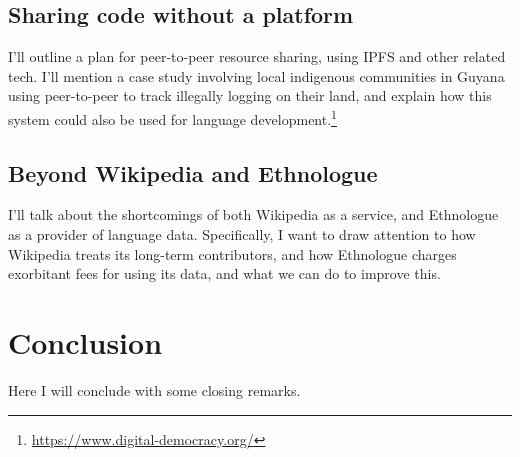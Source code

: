 \subsection{Sharing code without a platform}

I'll outline a plan for peer-to-peer resource sharing, using IPFS \citep{benet2014ipfs} and other related tech. I'll mention a case study involving local indigenous communities in Guyana using peer-to-peer to track illegally logging on their land, and explain how this system could also be used for language development.\footnote{\href{https://www.digital-democracy.org/}{https://www.digital-democracy.org/}}

\subsection{Beyond Wikipedia and Ethnologue}

I'll talk about the shortcomings of both Wikipedia as a service, and Ethnologue as a provider of language data. Specifically, I want to draw attention to how Wikipedia treats its long-term contributors, and how Ethnologue charges exorbitant fees for using its data, and what we can do to improve this.





%
%
%
%
%



\section{Conclusion}\label{sec:conclusion}

Here I will conclude with some closing remarks.